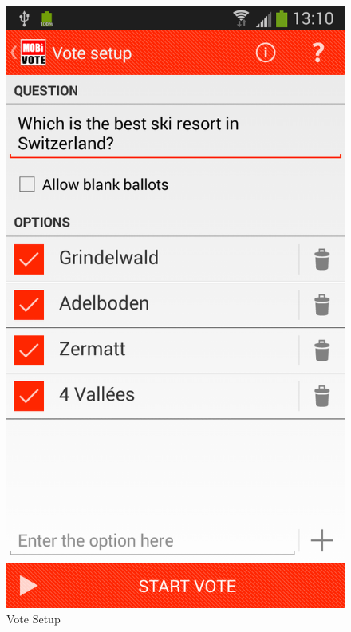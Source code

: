 \documentclass[numbers=noenddot, abstract=on, a4paper, headsepline,
footsepline, oneside, draft=off]{scrreprt}
\begin{document}
\begin{figure}[!htb]
\begin{minipage}{.5\textwidth}
		\includegraphics[height=.4\textheight]{img/screenshots/vote_details}
		\caption{Vote Setup}
		\label{fig:handbook_votesetup}
	\end{minipage}
\end{figure}
\end{document}
